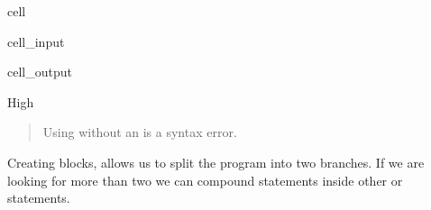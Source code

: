 \documentclass[letterpaper,10pt,english]{jupyterBook}
\begin{document}
\begin{sphinxuseclass}{cell}\begin{sphinxVerbatimInput}

\begin{sphinxuseclass}{cell_input}
\begin{sphinxVerbatim}[commandchars=\\\{\}]
  
   
\end{sphinxVerbatim}

\end{sphinxuseclass}\end{sphinxVerbatimInput}
\begin{sphinxVerbatimOutput}

\begin{sphinxuseclass}{cell_output}
\begin{sphinxVerbatim}[commandchars=\\\{\}]
High
\end{sphinxVerbatim}

\end{sphinxuseclass}\end{sphinxVerbatimOutput}

\end{sphinxuseclass}\begin{quote}

\sphinxAtStartPar
Using  without an  is a syntax error.
\end{quote}

\sphinxAtStartPar
Creating  blocks, allows us to split the program into two branches. If we are looking for more than two we can compound  statements inside other  or  statements.
\end{document}
